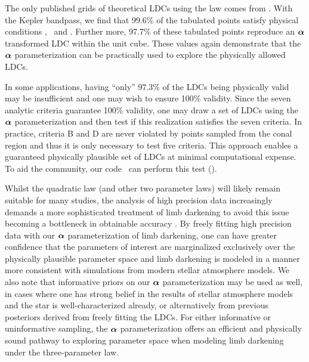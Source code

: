 The only published grids of theoretical LDCs using the \citet{sing:2009} law
comes from \citet{sing:2010}. With the Kepler bandpass, we find that 99.6\% of 
the \citet{sing:2010} tabulated points satisfy physical conditions \I, \II\ and 
\III. Further more, 97.7\% of these tabulated points reproduce an $\boldsymbol{\alpha}$
transformed LDC within the unit cube. These values again demonstrate that
the $\boldsymbol{\alpha}$ parameterization can be practically used to explore the
physically allowed LDCs. 

In some applications, having ``only'' $97.3$\% of the LDCs being physically 
valid may be insufficient and one may wish to ensure 100\% validity. Since 
the seven analytic criteria guarantee 100\% validity, one may draw a set of LDCs 
using the $\boldsymbol{\alpha}$ parameterization and then test if this realization 
satisfies the seven criteria. In practice, criteria B and D are never
violated by points sampled from the conal region and thus it is only necessary
to test five criteria. This approach enables a guaranteed physically plausible 
set of LDCs at minimal computational expense. To aid the community, our code 
\LDC\ can perform this test (\link).

Whilst the quadratic law (and other two parameter laws) will likely remain 
suitable for many studies, the analysis of high precision data increasingly 
demands a more sophisticated treatment of limb darkening to avoid this
issue becoming a bottleneck in obtainable accuracy \citep{epinoza:2015}. By 
freely fitting high precision data with our $\boldsymbol{\alpha}$ parameterization of 
\citet{sing:2009} limb darkening, one can have greater confidence that the 
parameters of interest are marginalized exclusively over the physically 
plausible parameter space and limb darkening is modeled in a manner more 
consistent with simulations from modern stellar atmosphere models. We also note 
that informative priors on our $\boldsymbol{\alpha}$ parameterization may be used as 
well, in cases where one has strong belief in the results of stellar atmosphere 
models and the star is well-characterized already, or alternatively from 
previous posteriors derived from freely fitting the LDCs. For either
informative or uninformative sampling, the $\boldsymbol{\alpha}$ parameterization offers
an efficient and physically sound pathway to exploring parameter space when
modeling limb darkening under the three-parameter law.
